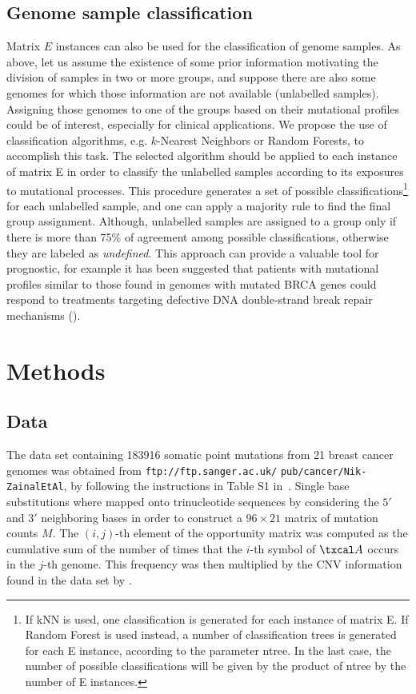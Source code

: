 \documentclass{bioinfo}
\begin{document}
\subsection{Genome sample classification}
Matrix $E$ instances can also be used for the classification of genome
samples.  As above, let us assume the existence of some prior
information motivating the division of samples in two or more groups,
and suppose there are also some genomes for which those information
are not available (unlabelled samples). Assigning those genomes to one
of the groups based on their mutational profiles could be of interest,
especially for clinical applications. We propose the use of
classification algorithms, e.g. $k$-Nearest Neighbors or Random
Forests, to accomplish this task. The selected algorithm should be
applied to each instance of matrix E in order to classify the
unlabelled samples according to its exposures to mutational processes.
This procedure generates a set of possible classifications\footnote{If
kNN is used, one classification is generated for each instance of
matrix E. If Random Forest is used instead, a number of classification
trees is generated for each E instance, according to the parameter
ntree. In the last case, the number of possible classifications will
be given by the product of ntree by the number of E instances.} for
each unlabelled sample, and one can apply a majority rule to find the
final group assignment.  Although, unlabelled samples are assigned to
a group only if there is more than 75\% of agreement among possible
classifications, otherwise they are labeled as
\textit{undefined}. This approach can provide a valuable tool for
prognostic, for example it has been suggested that patients with
mutational profiles similar to those found in genomes with mutated
BRCA genes could respond to treatments targeting defective DNA
double-strand break repair mechanisms (\citealp{Ash}).

\section{Methods}
\subsection{Data} The data set containing 183916 somatic point
mutations from 21 breast cancer genomes was obtained from
\verb+ftp://ftp.sanger.ac.uk/+ \verb+pub/cancer/Nik-ZainalEtAl+, by
following the instructions in Table S1 in~\cite{NCell}. Single base 
substitutions where mapped onto trinucleotide sequences by considering
the $5'$ and $3'$ neighboring bases in order to construct a $96\times
21$ matrix of mutation counts $M$. 
The $(i,j)$-th element of the opportunity matrix was computed as the
cumulative sum of the number of times that the $i$-th symbol of
$\txcal A$ occurs in the $j$-th genome. This frequency was then
multiplied by the CNV information found in the data set by
\cite{NCell}.
\end{document}
